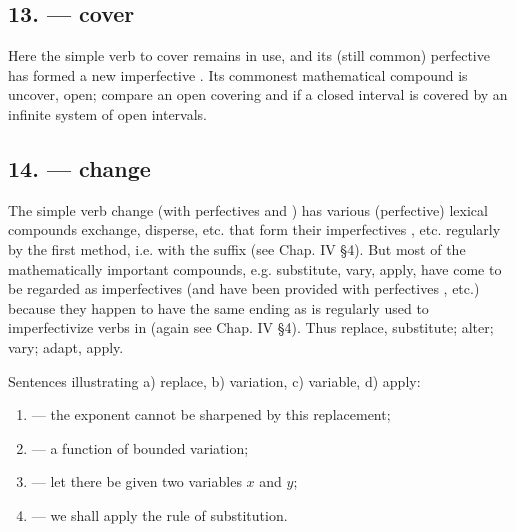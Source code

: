 \subsection*{13.  --- cover}

Here the simple verb  to cover remains in use, and its (still common) perfective  has formed a new imperfective . Its commonest mathematical compound is  uncover, open; compare  an open covering and  if a closed interval is covered by an infinite system of open intervals.

\subsection*{14.  --- change}

The simple verb  change (with perfectives  and ) has various (perfective) lexical compounds  exchange,  disperse, etc. that form their imperfectives , etc. regularly by the first method, i.e. with the suffix  (see Chap. IV §4). But most of the mathematically important compounds, e.g.  substitute,  vary,  apply, have come to be regarded as imperfectives (and have been provided with perfectives , etc.) because they happen to have the same ending  as is regularly used to imperfectivize verbs in  (again see Chap. IV §4). Thus  replace, substitute;  alter;  vary;  adapt, apply.

Sentences illustrating a)  replace, b)  variation, c)  variable, d)  apply:

\begin{enumerate}[label=\alph*)]
\item {} --- the exponent cannot be sharpened by this replacement;
\item {} --- a function of bounded variation;
\item {} --- let there be given two variables $x$ and $y$;
\item {} --- we shall apply the rule of substitution.
\end{enumerate}

